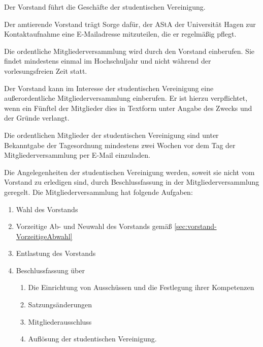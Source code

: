 \begin{contract}
Der Vorstand führt die Geschäfte der studentischen Vereinigung.

Der amtierende Vorstand trägt Sorge dafür, der AStA der Universität Hagen zur Kontaktaufnahme eine E-Mailadresse mitzuteilen, die er regelmäßig pflegt.


\label{sec:mitgliederversammlung}

Die ordentliche Mitgliederversammlung wird durch den Vorstand einberufen. Sie findet mindestens einmal im Hochschuljahr und nicht während der vorlesungsfreien Zeit statt. 

Der Vorstand kann im Interesse der studentischen Vereinigung eine außerordentliche Mitgliederversammlung einberufen. Er ist hierzu verpflichtet, wenn ein Fünftel der Mitglieder dies in Textform unter Angabe des Zwecks und der Gründe verlangt. 

Die ordentlichen Mitglieder der studentischen Vereinigung sind unter Bekanntgabe der Tagesordnung mindestens zwei Wochen vor dem Tag der Mitgliederversammlung per E-Mail einzuladen.

\label{sec:aufgabenMitgliederversammlung}

Die Angelegenheiten der studentischen Vereinigung werden, soweit sie nicht vom Vorstand zu erledigen sind, durch Beschlussfassung in der Mitgliederversammlung geregelt.
Die Mitgliederversammlung hat folgende Aufgaben:
\begin{enumerate}[label={(\arabic*)}]
    \item Wahl des Vorstands
    \item Vorzeitige Ab- und Neuwahl des Vorstands gemäß \ref{sec:vorstand-VorzeitigeAbwahl}
    \item Entlastung des Vorstands
    \item Beschlussfassung über
    \begin{enumerate}[label={\arabic*.}]
        \item  Die Einrichtung von Ausschüssen und die Festlegung ihrer Kompetenzen
        \item Satzungsänderungen
        \item Mitgliederausschluss
        \item Auflösung der studentischen Vereinigung.
    \end{enumerate}
\end{enumerate}




\end{contract}
